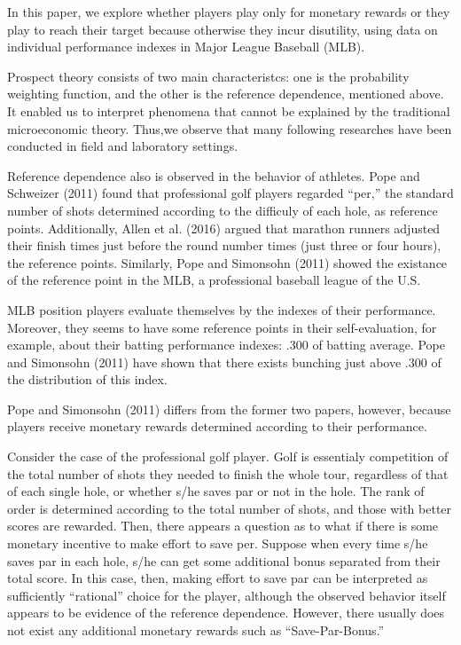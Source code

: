 \documentclass[dvipdfmx, 12pt]{article}
\begin{document}
In this paper, we explore whether players play only for monetary rewards or they play to reach their target because otherwise they incur disutility, using data on individual performance indexes in Major League Baseball (MLB).

Prospect theory consists of two main characteristcs: one is the probability weighting function, and the other is the reference dependence, mentioned above. It enabled us to interpret phenomena that cannot be explained by the traditional microeconomic theory. Thus,we observe that many following researches have been conducted in field and laboratory settings.

Reference dependence also is observed in the behavior of athletes. Pope and Schweizer (2011) found that professional golf players regarded ``per,'' the standard number of shots determined according to the difficuly of each hole, as reference points. Additionally, Allen et al. (2016) argued that marathon runners adjusted their finish times just before the round number times (just three or four hours), the reference points. Similarly, Pope and Simonsohn (2011) showed the existance of the reference point in the MLB, a professional baseball league of the U.S.

MLB position players evaluate themselves by the indexes of their performance. Moreover, they seems to have some reference points in their self-evaluation, for example, about their batting performance indexes: .300 of batting average. Pope and Simonsohn (2011) have shown that there exists bunching just above .300 of the distribution of this index.

Pope and Simonsohn (2011) differs from the former two papers, however, because players receive monetary rewards determined according to their performance.

Consider the case of the professional golf player. Golf is essentialy competition of the total number of shots they needed to finish the whole tour, regardless of that of each single hole, or whether s/he saves par or not in the hole. The rank of order is determined according to the total number of shots, and those with better scores are rewarded. Then, there appears a question as to what if there is some monetary incentive to make effort to save per. Suppose when every time s/he saves par in each hole, s/he can get some additional bonus separated from their total score. In this case, then, making effort to save par can be interpreted as sufficiently ``rational'' choice for the player, although the observed behavior itself appears to be evidence of the reference dependence. However, there usually does not exist any additional monetary rewards such as ``Save-Par-Bonus.''
\end{document}
